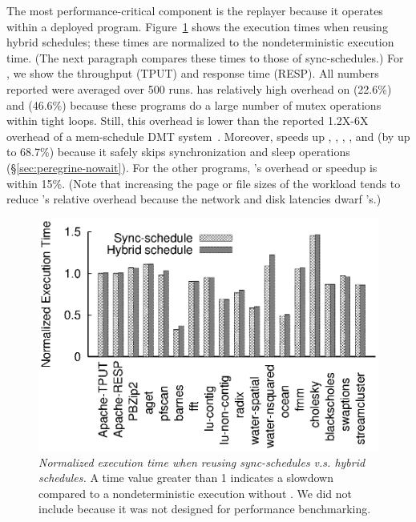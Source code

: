   The most performance-critical component is the
replayer because it operates within a deployed program.
Figure~\ref{fig:peregrine-overhead} shows the execution times when reusing hybrid
schedules; these times are normalized to the nondeterministic
execution time.  (The next paragraph compares these times to those of
sync-schedules.)  For \apache, we show the throughput (TPUT) and response
time (RESP).  All numbers reported were averaged over 500 runs.  \peregrine
has relatively high overhead on \watern (22.6\%) and \cholesky (46.6\%)
because these programs do a large number of mutex operations within tight loops.
Still, this overhead is
lower than the reported 1.2X-6X overhead of a mem-schedule DMT
system~\cite{coredet:asplos10}.  Moreover, \peregrine speeds up \barnes, \lun,
\radix, \waters, and \ocean (by up to 68.7\%) because it safely skips
synchronization and sleep operations (\S\ref{sec:peregrine-nowait}).  For the other
programs, \peregrine's overhead or speedup is within 15\%.  (Note that
increasing the page or file sizes of the workload
tends to reduce \peregrine's relative overhead
because the network and disk latencies dwarf \peregrine's.)

\begin{figure}[t]
\centering
\includegraphics[width=\columnwidth]{peregrine/figures/overhead.eps}
\vspace{-.3in}
\caption{{\em Normalized execution time when reusing sync-schedules
    v.s. hybrid schedules.}  A time value greater than 1
  indicates a slowdown compared to a nondeterministic execution without
  \peregrine.  We did not include \racey because it was not designed for
  performance benchmarking. } \label{fig:peregrine-overhead}
\end{figure}

